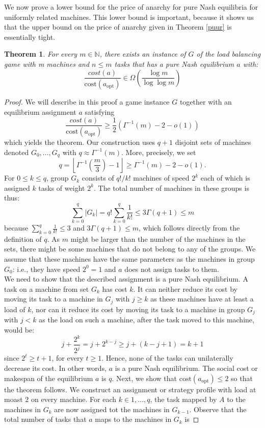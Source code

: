 \documentclass[a4paper,11pt]{article}
\newtheorem{theorem}{Theorem}[section]
\newcommand{\N}{{\mathbb N}}
\newcommand{\cost}{\text{cost}}
\newcommand{\opt}{\text{opt}}
\newcommand{\copt}{\cost(a_{\opt})}
\begin{document}
We now prove a lower bound for the price of anarchy for pure Nash equilibria for uniformly related machines. This lower bound is important, because it shows us that the upper bound on the price of anarchy given in Theorem \ref{puur} is essentially tight.

\begin{theorem}\label{puur2}
For every $m \in \N$, there exists an instance of $G$ of the load balancing game with m machines and $n \leq m$ tasks that has a pure Nash equilibrium $a$ with:
$$\frac{cost(a)}{\cost(a_{\opt})} \in \Omega\left(\frac{\log m}{\log \log m}\right)$$
\end{theorem}
\begin{proof}
We will describe in this proof a game instance $G$ together with an equilibrium assignment $a$ satisfying
$$\frac{cost(a)}{\cost(a_{\opt})} \geq \frac{1}{2} \left(\Gamma^{-1}(m) - 2 - o(1)\right)$$
which yields the theorem.
Our construction uses $q+1$ disjoint sets of machines denoted $G_0,...,G_q$ with $q \approx \Gamma^{-1}(m)$. More, precisely, we set
$$ q = \left\lfloor \Gamma^{-1}(\frac{m}{3}) - 1 \right\rfloor \geq \Gamma^{-1}(m)-2-o(1).$$
For $0 \leq k \leq q$, group $G_k$ consists of $q!/k!$ machines of speed $2^k$ each of which is assigned $k$ tasks of weight $2^k$. The total number of machines in these groups is thus:
$$\displaystyle\sum_{k=0}^{q} |G_k| = q! \displaystyle\sum_{k=0}^{q}\frac{1}{k!}\leq 3\Gamma(q+1) \leq m$$
because $\sum_{k=0}^{q}\frac{1}{k!} \leq 3$ and $3\Gamma(q+1)\leq m$, which follows directly from the definition of $q$. As $m$ might be larger than the number of the machines in the sets, there might be some machines that do not belong to any of the groups. We assume that these machines have the same parameters as the machines in group $G_0$: i.e., they have speed $2^0=1$ and $a$ does not assign tasks to them.\\
We need to show that the described assignment is a pure Nash equilibrium. A task on a machine from set $G_k$ has cost $k$. It can neither reduce its cost by moving its task to a machine in $G_j$ with $j\geq k$ as these machines have at least a load of $k$, nor can it reduce its cost by moving its task to a machine in group $G_j$ with $j < k$ as the load on such a machine, after the task moved to this machine, would be:
$$j + \frac{2^k}{2^j} = j + 2^{k-j} \geq j + (k - j + 1) = k + 1$$
since $2^t \geq t + 1$, for every $t\geq 1$. Hence, none of the tasks can unilaterally decrease its cost. In other words, $a$ is a pure Nash equilibrium.
The social cost or makespan of the equilibrium $a$ is $q$. Next, we show that $\copt \leq 2$ so that the theorem follows. We construct an assignment or strategy profile with load at moast $2$ on every machine. For each $k \in {1,...,q}$, the task mapped by $A$ to the machines in $G_k$ are now assigned tot the machines in $G_{k-1}$. Observe that the total number of tasks that $a$ maps to the machines in $G_k$ is

\end{proof}
\end{document}
